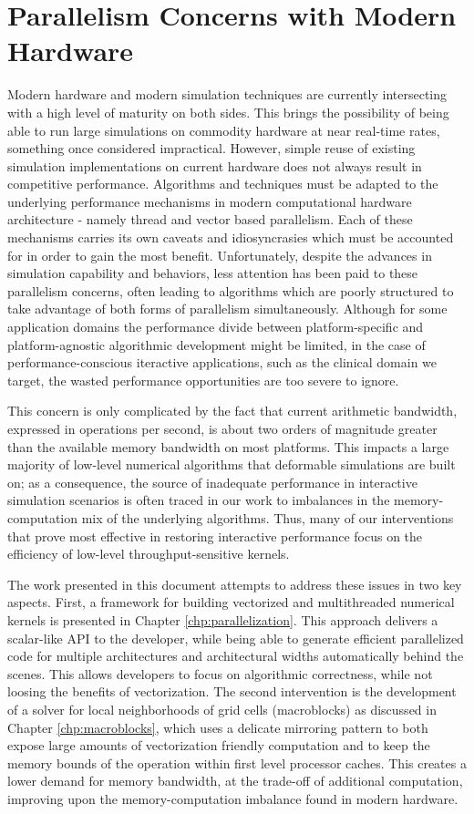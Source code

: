 \section{Parallelism Concerns with Modern Hardware}

Modern hardware and modern simulation techniques are currently
intersecting with a high level of maturity on both sides. This brings
the possibility of being able to run large simulations on commodity
hardware at near real-time rates, something once considered
impractical. However, simple reuse of existing simulation
implementations on current hardware does not always result in
competitive performance. Algorithms and techniques must be adapted to
the underlying performance mechanisms in modern computational hardware
architecture - namely thread and vector based parallelism. Each of
these mechanisms carries its own caveats and idiosyncrasies which must
be accounted for in order to gain the most benefit. Unfortunately,
despite the advances in simulation capability and behaviors, less
attention has been paid to these parallelism concerns, often leading
to algorithms which are poorly structured to take advantage of both
forms of parallelism simultaneously. Although for some application
domains the performance divide between platform-specific and
platform-agnostic algorithmic development might be limited, in the
case of performance-conscious iteractive applications, such as the
clinical domain we target, the wasted performance opportunities are too
severe to ignore.

This concern is only complicated by the fact that current arithmetic
bandwidth, expressed in operations per second, is about two orders of
magnitude greater than the available memory bandwidth on most
platforms. This impacts a large majority of low-level numerical
algorithms that deformable simulations are built on; as a consequence,
the source of inadequate performance in interactive simulation
scenarios is often traced in our work to imbalances in the
memory-computation mix of the underlying algorithms. Thus, many of our
interventions that prove most effective in restoring interactive
performance focus on the efficiency of low-level throughput-sensitive
kernels.

The work presented in this document attempts to address these issues
in two key aspects. First, a framework for building vectorized and
multithreaded numerical kernels is presented in Chapter
\ref{chp:parallelization}. This approach delivers a scalar-like API to
the developer, while being able to generate efficient parallelized
code for multiple architectures and architectural widths automatically
behind the scenes. This allows developers to focus on algorithmic
correctness, while not loosing the benefits of vectorization. The
second intervention is the development of a solver for local
neighborhoods of grid cells (macroblocks) as discussed in Chapter
\ref{chp:macroblocks}, which uses a delicate mirroring pattern to both
expose large amounts of vectorization friendly computation and to keep
the memory bounds of the operation within first level processor
caches. This creates a lower demand for memory bandwidth, at the
trade-off of additional computation, improving upon the
memory-computation imbalance found in modern hardware.

